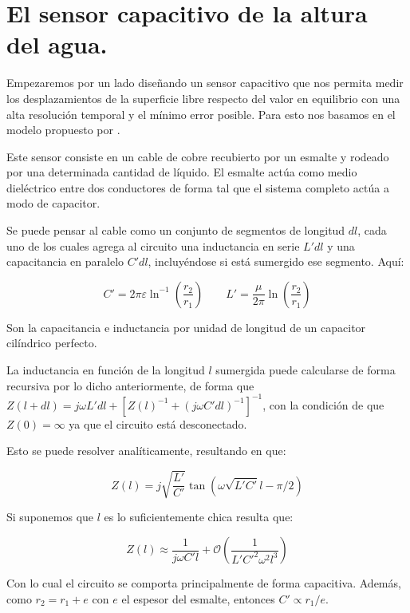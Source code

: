 \section{El sensor capacitivo de la altura del agua.}
Empezaremos por un lado diseñando un sensor capacitivo que nos permita medir los desplazamientos de la superficie libre respecto del valor en equilibrio con una alta resolución temporal y el mínimo error posible. Para esto nos basamos en el modelo propuesto por \cite{zavaletaNonpropagatingHydrodynamicSolitons2012}.

Este sensor consiste en un cable de cobre recubierto por un esmalte y rodeado por una determinada cantidad de líquido. El esmalte actúa como medio dieléctrico entre dos conductores de forma tal que el sistema completo actúa a modo de capacitor.

Se puede pensar al cable como un conjunto de segmentos de longitud $dl$, cada uno de los cuales agrega al circuito una inductancia en serie $L'dl$ y una capacitancia en paralelo $C'dl$, incluyéndose si está sumergido ese segmento. Aquí:

\begin{equation}
	C' = 2\pi\varepsilon\ln^{-1}\left(\frac{r_2}{r_1}\right) \qquad L'= \frac{\mu}{2\pi}\ln\left(\frac{r_2}{r_1}\right)
\end{equation} 

Son la capacitancia e inductancia por unidad de longitud de un capacitor cilíndrico perfecto.

La inductancia en función de la longitud $l$ sumergida puede calcularse de forma recursiva por lo dicho anteriormente, de forma que $Z(l+dl) = j\omega L'dl + [Z(l)^{-1} + (j\omega C' dl)^{-1}]^{-1}$, con la condición de que $Z(0) = \infty$ ya que el circuito está desconectado.

Esto se puede resolver analíticamente, resultando en que:

\begin{equation}
	Z(l) = j\sqrt{\frac{L'}{C'}} \tan\left(\omega \sqrt{L'C'} l - \pi/2\right)
\end{equation}

Si suponemos que $l$ es lo suficientemente chica resulta que:

\begin{equation}
	Z(l) \approx \frac{1}{j\omega C' l} + \mathcal{O}\left(\frac{1}{L'C'^2\omega^2l^3}\right)
\end{equation} 

Con lo cual el circuito se comporta principalmente de forma capacitiva. Además, como $r_2=r_1+e$ con $e$ el espesor del esmalte, entonces $C'\propto r_1/e$.

